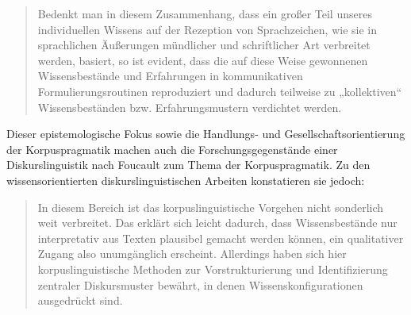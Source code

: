 \begin{quote}
Bedenkt man in diesem Zusammenhang, dass ein großer Teil unseres individuellen Wissens auf der Rezeption von Sprachzeichen, wie sie in sprachlichen Äußerungen mündlicher und schriftlicher Art verbreitet werden, basiert, so ist evident, dass die auf diese Weise gewonnenen Wissensbestände und Erfahrungen in kommunikativen Formulierungsroutinen reproduziert und dadurch teilweise zu „kollektiven`` Wissensbeständen bzw. Erfahrungsmustern verdichtet werden. \autocite[6]{felderKorpuspragmatikParadigmaZwischen2012}
\end{quote}

Dieser epistemologische Fokus sowie die Handlungs- und Gesellschaftsorientierung der Korpuspragmatik machen auch die Forschungsgegenstände einer Diskurslinguistik nach Foucault \autocite{warnkeDiskurslinguistikNachFoucault2007a} zum Thema der Korpuspragmatik. Zu den wissensorientierten diskurslinguistischen Arbeiten konstatieren sie jedoch:

\begin{quote}
In diesem Bereich ist das korpuslinguistische Vorgehen nicht sonderlich weit verbreitet. Das erklärt sich leicht dadurch, dass Wissensbestände nur interpretativ aus Texten plausibel gemacht werden können, ein qualitativer Zugang also unumgänglich erscheint. Allerdings haben sich hier korpuslinguistische Methoden zur Vorstrukturierung und Identifizierung zentraler Diskursmuster bewährt, in denen Wissenskonfigurationen ausgedrückt sind. \autocite[14]{felderKorpuspragmatikParadigmaZwischen2012}
\end{quote}

